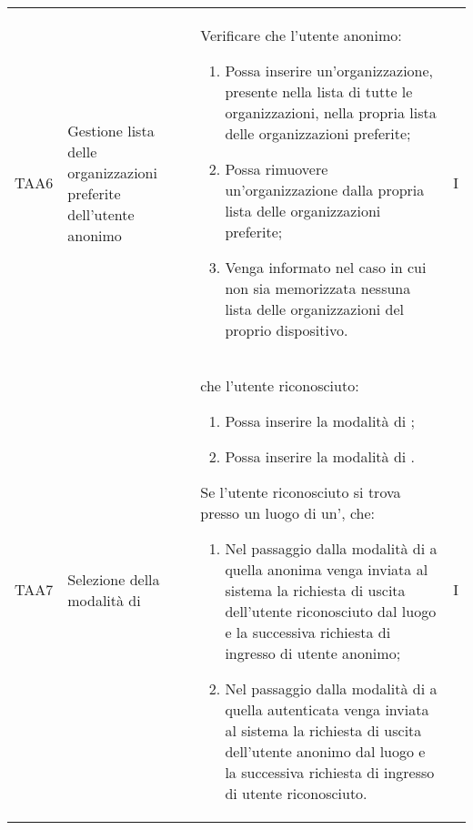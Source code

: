 {\begin{longtable}{ c  C{2.5cm}  C{10cm} C{1cm}}
TAA6 & Gestione lista delle organizzazioni preferite dell'utente anonimo &
Verificare che l'utente anonimo:
\begin{enumerate}
    \item Possa inserire un'organizzazione, presente nella lista di tutte le organizzazioni, nella propria lista delle organizzazioni preferite;
    \item Possa rimuovere un'organizzazione dalla propria lista delle organizzazioni preferite;
    \item Venga informato nel caso in cui non sia memorizzata nessuna lista delle organizzazioni del proprio dispositivo.
\end{enumerate} & I \\

TAA7 & Selezione della modalità di  & 
 che l'utente riconosciuto:
\begin{enumerate}
    \item Possa inserire la modalità di ;
    \item Possa inserire la modalità di .
\end{enumerate}
Se l'utente riconosciuto si trova presso un luogo di un',  che:
\begin{enumerate}[resume]
    \item Nel passaggio dalla modalità di  a quella anonima venga inviata al sistema la richiesta di uscita dell'utente riconosciuto dal luogo e la successiva richiesta di ingresso di utente anonimo;
    \item Nel passaggio dalla modalità di  a quella autenticata venga inviata al sistema la richiesta di uscita dell'utente anonimo dal luogo e la successiva richiesta di ingresso di utente riconosciuto.
\end{enumerate} & I \\


\end{longtable}}
